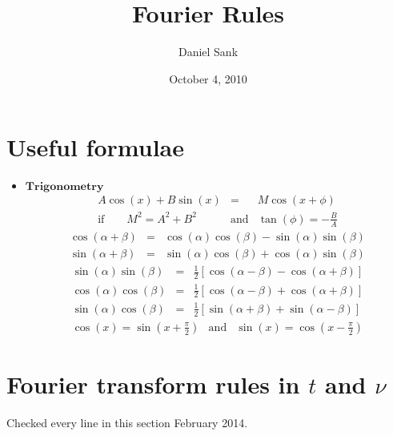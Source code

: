 \documentclass{article}
\author{Daniel Sank}
\title{Fourier Rules}
\date{October 4, 2010}
\begin{document}
\maketitle

\section*{Useful formulae}

\begin{itemize}
\item $\textbf{Trigonometry}$\begin{eqnarray*}
A\cos(x)+B\sin(x) & = & M\cos(x+\phi)\\
\textrm{if}\qquad M^{2}=A^{2}+B^{2} & \textrm{and} & \tan(\phi)=-\frac{B}{A}\end{eqnarray*}
 \begin{eqnarray*}
\cos\left(\alpha+\beta\right) & = & \cos\left(\alpha\right)\cos\left(\beta\right)-\sin\left(\alpha\right)\sin\left(\beta\right)\\
\sin\left(\alpha+\beta\right) & = & \sin\left(\alpha\right)\cos\left(\beta\right)+\cos\left(\alpha\right)\sin\left(\beta\right)\end{eqnarray*}
 \begin{eqnarray*}
\sin\left(\alpha\right)\sin\left(\beta\right) & = & \frac{1}{2}\left[\cos\left(\alpha-\beta\right)-\cos\left(\alpha+\beta\right)\right]\\
\cos\left(\alpha\right)\cos\left(\beta\right) & = & \frac{1}{2}\left[\cos\left(\alpha-\beta\right)+\cos\left(\alpha+\beta\right)\right]\\
\sin\left(\alpha\right)\cos\left(\beta\right) & = & \frac{1}{2}\left[\sin\left(\alpha+\beta\right)+\sin\left(\alpha-\beta\right)\right]\end{eqnarray*}
 \begin{eqnarray*}
\cos\left(x\right)=\sin\left(x+\frac{\pi}{2}\right) & \textrm{and} & \sin\left(x\right)=\cos\left(x-\frac{\pi}{2}\right)\end{eqnarray*}

\end{itemize}

\section*{Fourier transform rules in $t$ and $\nu$}

Checked every line in this section February 2014.
\end{document}
